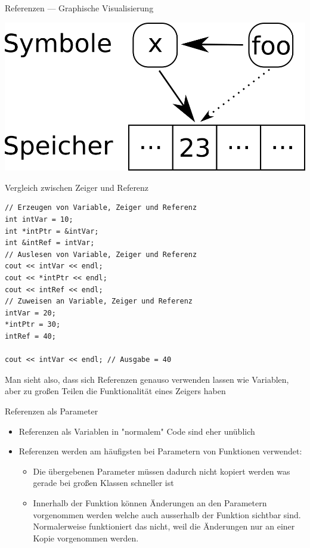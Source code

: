 \documentclass[presentation]{beamer}
\begin{document}
\begin{frame}[label={sec:orgeef9998}]{Referenzen --- Graphische Visualisierung}
\begin{center}
\includegraphics[width=.9\linewidth]{img/references.png}
\end{center}
\end{frame}
\begin{frame}[label={sec:org6b083b4},fragile]{Vergleich zwischen Zeiger und Referenz}
 \begin{verbatim}
// Erzeugen von Variable, Zeiger und Referenz
int intVar = 10;
int *intPtr = &intVar;
int &intRef = intVar;
// Auslesen von Variable, Zeiger und Referenz
cout << intVar << endl;
cout << *intPtr << endl;
cout << intRef << endl;
// Zuweisen an Variable, Zeiger und Referenz
intVar = 20;
*intPtr = 30;
intRef = 40;

cout << intVar << endl; // Ausgabe = 40
\end{verbatim}

Man sieht also, dass sich Referenzen genauso verwenden lassen wie
Variablen, aber zu großen Teilen die Funktionalität eines Zeigers
haben
\end{frame}
\begin{frame}[label={sec:org4b3b559}]{Referenzen als Parameter}
\begin{itemize}
\item Referenzen als Variablen in "normalem" Code sind eher unüblich
\item Referenzen werden am häufigsten bei Parametern von Funktionen
verwendet:
\begin{itemize}
\item Die übergebenen Parameter müssen dadurch nicht kopiert werden was
gerade bei großen Klassen schneller ist
\item Innerhalb der Funktion können Änderungen an den Parametern
vorgenommen werden welche auch ausserhalb der Funktion sichtbar
sind. Normalerweise funktioniert das nicht, weil die Änderungen
nur an einer Kopie vorgenommen werden.
\end{itemize}
\end{itemize}
\end{frame}
\end{document}
